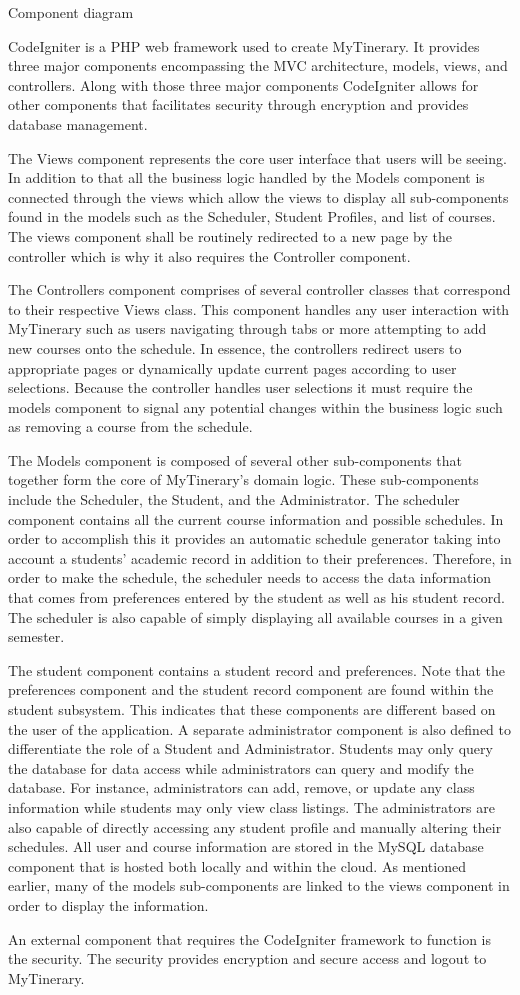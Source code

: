 Component diagram

CodeIgniter is a PHP web framework used to create MyTinerary. It
provides three major components encompassing the MVC architecture,
models, views, and controllers. Along with those three major components
CodeIgniter allows for other components that facilitates security
through encryption and provides database management.

The Views component represents the core user interface that users will
be seeing. In addition to that all the business logic handled by the
Models component is connected through the views which allow the views to
display all sub-components found in the models such as the Scheduler,
Student Profiles, and list of courses. The views component shall be
routinely redirected to a new page by the controller which is why it
also requires the Controller component.

The Controllers component comprises of several controller classes that
correspond to their respective Views class. This component handles any
user interaction with MyTinerary such as users navigating through tabs
or more attempting to add new courses onto the schedule. In essence, the
controllers redirect users to appropriate pages or dynamically update
current pages according to user selections. Because the controller
handles user selections it must require the models component to signal
any potential changes within the business logic such as removing a
course from the schedule.

The Models component is composed of several other sub-components that
together form the core of MyTinerary's domain logic. These
sub-components include the Scheduler, the Student, and the
Administrator. The scheduler component contains all the current course
information and possible schedules. In order to accomplish this it
provides an automatic schedule generator taking into account a students'
academic record in addition to their preferences. Therefore, in order to
make the schedule, the scheduler needs to access the data information
that comes from preferences entered by the student as well as his
student record. The scheduler is also capable of simply displaying all
available courses in a given semester.

The student component contains a student record and preferences. Note
that the preferences component and the student record component are
found within the student subsystem. This indicates that these components
are different based on the user of the application. A separate
administrator component is also defined to differentiate the role of a
Student and Administrator. Students may only query the database for data
access while administrators can query and modify the database. For
instance, administrators can add, remove, or update any class
information while students may only view class listings. The
administrators are also capable of directly accessing any student
profile and manually altering their schedules. All user and course
information are stored in the MySQL database component that is hosted
both locally and within the cloud. As mentioned earlier, many of the
models sub-components are linked to the views component in order to
display the information.

An external component that requires the CodeIgniter framework to
function is the security. The security provides encryption and secure
access and logout to MyTinerary.

